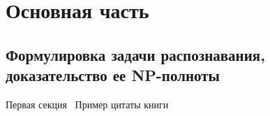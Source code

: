 
\section{Основная часть}
\subsection{Формулировка задачи распознавания, доказательство ее NP-полноты}

Первая секция~\cite{ex_pub}
Пример цитаты книги~\cite{ex_book}
